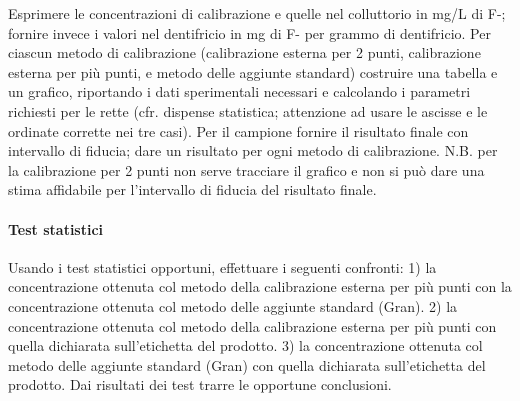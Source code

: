 Esprimere le concentrazioni di calibrazione e quelle nel colluttorio in mg/L di F-; fornire invece i valori nel dentifricio in mg di F- per grammo di dentifricio. Per ciascun metodo di calibrazione (calibrazione esterna per 2 punti, calibrazione esterna per più punti, e metodo delle aggiunte standard) costruire una tabella e un grafico, riportando i dati sperimentali necessari e calcolando i parametri richiesti per le rette (cfr. dispense statistica; attenzione ad usare le ascisse e le ordinate corrette nei tre casi). Per il campione fornire il risultato finale con intervallo di fiducia; dare un risultato per ogni metodo di calibrazione. N.B. per la calibrazione per 2 punti non serve tracciare il grafico e non si può dare una stima affidabile per l'intervallo di fiducia del risultato finale.

\paragraph{Test statistici}

Usando i test statistici opportuni, effettuare i seguenti confronti:
1) la concentrazione ottenuta col metodo della calibrazione esterna per più punti con la concentrazione ottenuta col metodo delle aggiunte standard (Gran).
2) la concentrazione ottenuta col metodo della calibrazione esterna per più punti con quella dichiarata sull'etichetta del prodotto.
3) la concentrazione ottenuta col metodo delle aggiunte standard (Gran) con quella dichiarata sull'etichetta del prodotto.
Dai risultati dei test trarre le opportune conclusioni.



